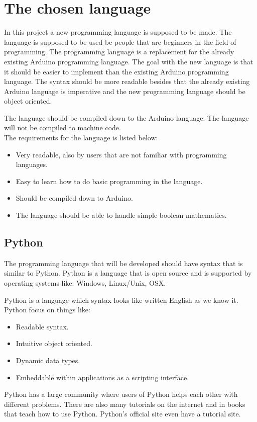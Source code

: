 \section{The chosen language}
In this project a new programming language is supposed to be made. The language is supposed to be used be people that are beginners in the field of programming. The programming language is a replacement for the already existing Arduino programming language. 
The goal with the new language is that it should be easier to implement than the existing Arduino programming language. The syntax should be more readable besides that the already existing Arduino language is imperative and the new programming language should be object oriented. 

The language should be compiled down to the Arduino language. The language will not be compiled to machine code. \\

The requirements for the language is listed below:
\begin{itemize}
	\item Very readable, also by users that are not familiar with programming languages.
	\item Easy to learn how to do basic programming in the language.
	\item Should be compiled down to Arduino.
	\item The language should be able to handle simple boolean mathematics.
\end{itemize}

\subsection{Python}
The programming language that will be developed should have syntax that is similar to Python. Python is a language that is open source and is supported by operating systems like: Windows, Linux/Unix, OSX.

Python is a language which syntax looks like written English as we know it.
Python focus on things like:

\begin{itemize}
	\item Readable syntax.
	\item Intuitive object oriented.
	\item Dynamic data types.
	\item Embeddable within applications as a scripting interface.
\end{itemize} 
\cite{python:official:about}
Python has a large community where users of Python helps each other with different problems. There are also many tutorials on the internet and in books that teach how to use Python. Python's official site even have a tutorial site.\cite{python:official:tutorial}
